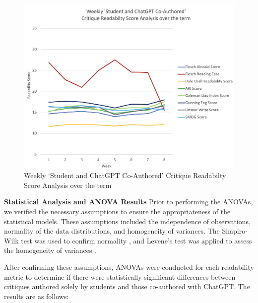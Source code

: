 \begin{figure}[h!]
	\centering
	\includegraphics[width=1.0\linewidth]{"figures/Student and ChatGPT Co-Authored"}
	\caption[`Student and ChatGPT Co-Authored' Critique Readabilty Scores]{Weekly `Student and ChatGPT Co-Authored' Critique Readabilty Score Analysis over the term}
	\label{fig:student-and-chatgpt-co-authored-readability-scores}
\end{figure}

\textbf{Statistical Analysis and ANOVA Results}
Prior to performing the ANOVAs, we verified the necessary assumptions to ensure the appropriateness of the statistical models. These assumptions included the independence of observations, normality of the data distributions, and homogeneity of variances. The Shapiro-Wilk test was used to confirm normality \cite{ShapiroWilk_1965}, and Levene's test was applied to assess the homogeneity of variances \cite{Levene_1960}.

After confirming these assumptions, ANOVAs were conducted for each readability metric to determine if there were statistically significant differences between critiques authored solely by students and those co-authored with ChatGPT. The results are as follows:

